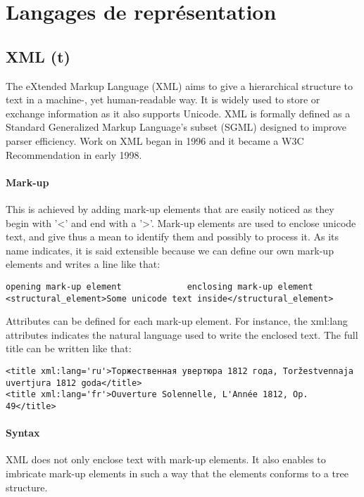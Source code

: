 \section{Langages de représentation}\label{s:mods}

\subsection{XML (t)}
The eXtended Markup Language (XML) aims to give a hierarchical structure to  text in a machine-, yet human-readable way. It is widely used to store or exchange information as it also supports Unicode.
XML is formally defined as a Standard Generalized Markup Language's subset (SGML) designed to improve parser efficiency. Work on XML began in 1996 and it became a W3C Recommendation in early 1998.

\paragraph{Mark-up}
This is achieved by adding mark-up elements that are easily noticed as they begin with '<' and end with a '>'. Mark-up elements are used to enclose unicode text, and give thus a mean to identify them and possibly to process it. As its name indicates, it is said extensible because we can define our own mark-up elements and writes a line like that:

\begin{Verbatim}[fontsize=\small,formatcom=\color{black!70}]
opening mark-up element 			enclosing mark-up element
<structural_element>Some unicode text inside</structural_element>
\end{Verbatim}

Attributes can be defined for each mark-up element. 
For instance, the xml:lang attributes indicates the natural language used to write the enclosed text. The  full title can be written like that:
\begin{Verbatim}[fontsize=\small,formatcom=\color{black!70}]
<title xml:lang='ru'>Торжественная увертюра 1812 года, Toržestvennaja uvertjura 1812 goda</title>
<title xml:lang='fr'>Ouverture Solennelle, L'Année 1812, Op. 49</title>
\end{Verbatim}

\paragraph{Syntax}
XML does not only enclose text with mark-up elements. It also enables to imbricate mark-up elements in such a way that the elements conforms to a tree structure. 

